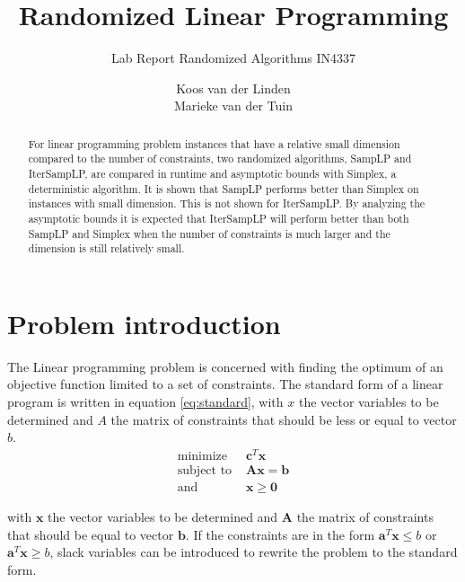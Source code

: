 \documentclass[nocopyrightspace]{acm_proc_article-sp}
\begin{document}
\title{Randomized Linear Programming}
\subtitle{Lab Report Randomized Algorithms IN4337}
\author{
\alignauthor
Koos van der Linden \\ 
\alignauthor
Marieke van der Tuin \\ 
}
\maketitle
\begin{abstract}
For linear programming problem instances that have a relative small dimension compared to the number of constraints, two randomized algorithms, SampLP and IterSampLP, are compared in runtime and asymptotic bounds with Simplex, a deterministic algorithm. It is shown that SampLP performs better than Simplex on instances with small dimension. This is not shown for IterSampLP. By analyzing the asymptotic bounds it is expected that IterSampLP will perform better than both SampLP and Simplex when the number of constraints is much larger and the dimension is still relatively small.
\end{abstract}

\section{Problem introduction}
The Linear programming problem is concerned with finding the optimum of an objective function limited to a set of constraints. The standard form of a linear program is written in equation \ref{eq:standard}, with $x$ the vector variables to be determined and $A$ the matrix of constraints that should be less or equal to vector $b$.
\begin{equation}
\label{eq:standard}
\begin{split}
\text{minimize } & \mathbf{c}^T \mathbf{x} \\
\text{subject to } &  \mathbf{Ax} = \mathbf{b} \\
\text{and } & \mathbf{x} \geq \mathbf{0}
\end{split}
\end{equation}

with $\mathbf{x}$ the vector variables to be determined and $\mathbf{A}$ the matrix of constraints that should be equal to vector $\mathbf{b}$. If the constraints are in the form $\mathbf{a}^T \mathbf{x} \leq b$ or $\mathbf{a}^T \mathbf{x} \geq b$, slack variables can be introduced to rewrite the problem to the standard form. 
\end{document}
